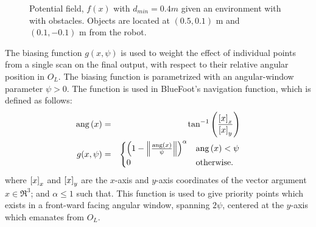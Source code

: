 				\begin{figure}[t!]
					\centering
					\caption{Potential field, $f(x)$ with $d_{min}=0.4m$ given an environment with with obstacles. Objects are located at $(0.5,0.1)\text{ m}$ and $(0.1,-0.1)\text{ m}$ from the robot. }
					\label{fig::potential_field}
				\end{figure}

			The biasing function $g(x,\psi)$ is used to weight the effect of individual points from a single scan on the final output, with respect to their relative angular position in $O_{L}$. The biasing function is parametrized with an angular-window parameter $\psi>0$. The function is used in BlueFoot's navigation function, which is defined as follows:
				\begin{eqnarray}
					\text{ang}\left(x\right) &=& \tan^{-1}\left( \frac{\left[x\right]_{x}}{\left[x\right]_{y}} \right) \nonumber\\
					g(x,\psi) &=& 
					\begin{cases}
					\left(1-\left\lVert\frac{\text{ang}\left(x\right)}{\psi}\right\rVert\right)^{\alpha}	& \text{ang}\left(x\right) < \psi \\
					0 	& \text{otherwise}.
					\end{cases}
				\end{eqnarray}
			where $\left[x\right]_{x}$ and $\left[x\right]_{y}$ are the $x$-axis and $y$-axis coordinates of the vector argument $x\in\Re^{3}$; and $\alpha\leq1$ such that. This function is used to give priority points which exists in a front-ward facing angular window, spanning $2 \psi$, centered at the $y$-axis which emanates from $O_{L}$. %

